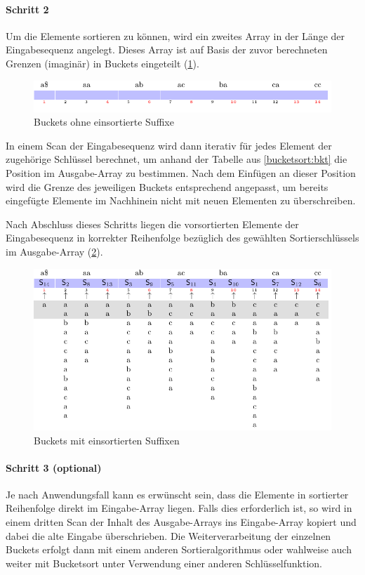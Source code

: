 \paragraph{Schritt 2}
Um die Elemente sortieren zu können, wird ein zweites Array in der Länge der Eingabesequenz angelegt. Dieses Array ist auf Basis der zuvor berechneten Grenzen (imaginär) in Buckets eingeteilt (\cref{bucketsort:empty_buckets}).
\begin{figure}[ht]
    \includegraphics[width=\textwidth]{kapitel/4_komponenten/sortieralgorithmen/bucketsort/step_02/empty_buckets/image.pdf}
    \caption{Buckets ohne einsortierte Suffixe}
    \label{bucketsort:empty_buckets}
\end{figure}
In einem Scan der Eingabesequenz wird dann iterativ für jedes Element der zugehörige Schlüssel berechnet, um anhand der Tabelle aus \cref{bucketsort:bkt} die Position im Ausgabe-Array zu bestimmen. Nach dem Einfügen an dieser Position wird die Grenze des jeweiligen Buckets entsprechend angepasst, um bereits eingefügte Elemente im Nachhinein nicht mit neuen Elementen zu überschreiben.\par
Nach Abschluss dieses Schritts liegen die vorsortierten Elemente der Eingabesequenz in korrekter Reihenfolge bezüglich des gewählten Sortierschlüssels im Ausgabe-Array (\cref{bucketsort:buckets}).
\begin{figure}[ht]
    \includegraphics[width=\textwidth]{kapitel/4_komponenten/sortieralgorithmen/bucketsort/step_02/buckets/image.pdf}
    \caption{Buckets mit einsortierten Suffixen}
    \label{bucketsort:buckets}
\end{figure}
\paragraph{Schritt 3 (optional)}
Je nach Anwendungsfall kann es erwünscht sein, dass die Elemente in sortierter Reihenfolge direkt im Eingabe-Array liegen. Falls dies erforderlich ist, so wird in einem dritten Scan der Inhalt des Ausgabe-Arrays ins Eingabe-Array kopiert und dabei die alte Eingabe überschrieben. Die Weiterverarbeitung der einzelnen Buckets erfolgt dann mit einem anderen Sortieralgorithmus oder wahlweise auch weiter mit Bucketsort unter Verwendung einer anderen Schlüsselfunktion.
